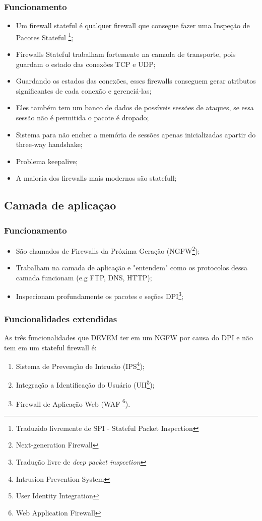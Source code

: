 \begin{frame}
	\frametitle{Funcionamento}
	\begin{itemize}
		\item Um firewall stateful é qualquer firewall que consegue fazer uma Inspeção de Pacotes Stateful \footnote{Traduzido livremente de SPI - Stateful Packet Inspection};
		\item Firewalls Stateful trabalham fortemente na camada de transporte, pois guardam o estado das conexões TCP e UDP;
		\item Guardando os estados das conexões, esses firewalls conseguem gerar atributos significantes de cada conexão e gerenciá-las;
		\item Eles também tem um banco de dados de possíveis sessões de ataques, se essa sessão não é permitida o pacote é dropado;
		\item Sistema para não encher a memória de sessões apenas inicializadas apartir do three-way handshake;
		\item Problema keepalive;
		\item A maioria dos firewalls mais modernos são statefull;
	\end{itemize}
\end{frame}


\subsection{Camada de aplicaçao}

\begin{frame}
	\frametitle{Funcionamento}
	\begin{itemize}
		\item São chamados de Firewalls da Próxima Geração (NGFW\footnote{Next-generation Firewall});
		\item Trabalham na camada de aplicação e "entendem" como os protocolos dessa camada funcionam (e.g FTP, DNS, HTTP);
		\item Inspecionam profundamente os pacotes e seções DPI\footnote{Tradução livre de \textit{deep packet inspection}};
	\end{itemize}
\end{frame}

\begin{frame}
	\frametitle{Funcionalidades extendidas}
	As três funcionalidades que DEVEM ter em um NGFW por causa do DPI e não tem em um stateful firewall é:
	\begin{enumerate}[i]
		\item Sistema de Prevenção de Intrusão (IPS\footnote{Intrusion Prevention System});
		\item Integração a Identificação do Usuário (UII\footnote{User Identity Integration});
		\item Firewall de Aplicação Web (WAF \footnote{Web Application Firewall}).
	\end{enumerate}
\end{frame}
